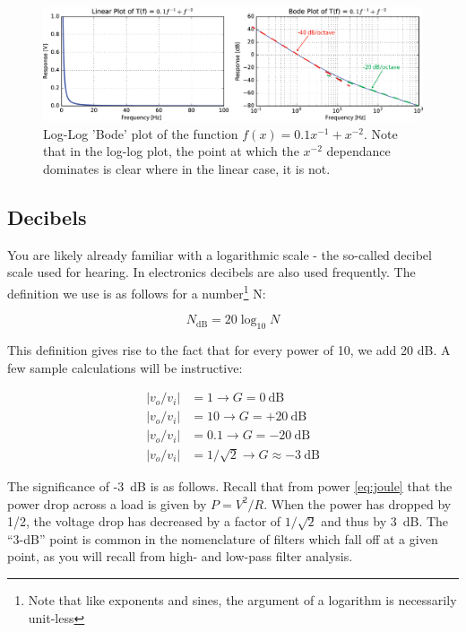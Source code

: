 \documentclass{tufte-book}
\begin{document}
\begin{figure}[h]
\caption{Log-Log 'Bode' plot of the function $f(x) = 0.1x^{-1}+x^{-2}$. Note that in the log-log plot, the point at which the $x^{-2}$ dependance dominates is clear where in the linear case, it is not.}
\label{ fig:BodePowers}
\begin{center}
\includegraphics[width=\textwidth]{BodePowers.png}
\end{center}
\end{figure}


\subsection{Decibels}
You are likely already familiar with a logarithmic scale - the so-called decibel scale used for hearing. In electronics decibels are also used frequently. The definition we use is as follows for a number\footnote{Note that like exponents and sines, the argument of a logarithm is necessarily unit-less} N:

$$
N_\text{dB} = 20\log_{10}N
$$

This definition gives rise to the fact that for every power of 10, we add 20 dB. A few sample calculations will be instructive:


\begin{align*}
|v_o/v_i| &= 1 \rightarrow G=0~\text{dB} \\
|v_o/v_i| &= 10  \rightarrow G=+20~\text{dB} \\
|v_o/v_i| &=0.1 \rightarrow G=-20~\text{dB}\\
|v_o/v_i| &= 1/\sqrt{2} \rightarrow G\approx -3~\text{dB}
\end{align*}

The significance of -3~dB is as follows. Recall that from power \ref{eq:joule} that the power drop across a load is given by $P = V^2/R$. When the power has dropped by 1/2, the voltage drop has decreased by a factor of $1/\sqrt{2}$ and thus by 3~dB. The ``3-dB'' point is common in the nomenclature of filters which fall off at a given point, as you will recall from high- and low-pass filter analysis.
\end{document}
